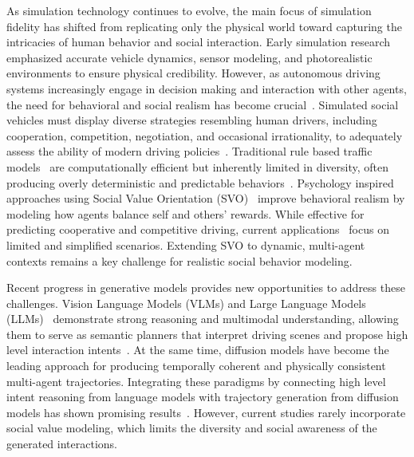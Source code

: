 As simulation technology continues to evolve, the main focus of simulation fidelity has shifted from replicating only the physical world toward capturing the intricacies of human behavior and social interaction.  Early simulation research~\citep{feng2022trafficgen, ding2024realgen} emphasized accurate vehicle dynamics, sensor modeling, and photorealistic environments to ensure physical credibility. However, as autonomous driving systems increasingly engage in decision making and interaction with other agents, the need for behavioral and social realism has become crucial~\citep{zhan2019interaction}. Simulated social vehicles must display diverse strategies resembling human drivers, including cooperation, competition, negotiation, and occasional irrationality, to adequately assess the ability of modern driving policies~\citep{schwarting2019social, jin2024surrealdriver}. Traditional rule based traffic models~\citep{treiber2000congested} are computationally efficient but inherently limited in diversity, often producing overly deterministic and predictable behaviors~\citep{suo2021trafficsim}. 
Psychology inspired approaches using Social Value Orientation (SVO)~\citep{schwarting2019social} improve behavioral realism by modeling how agents balance self and others' rewards. While effective for predicting cooperative and competitive driving, current applications~\citep{dai2023socially} focus on limited and simplified scenarios. Extending SVO to dynamic, multi-agent contexts remains a key challenge for realistic social behavior modeling.

Recent progress in generative models provides new opportunities to address these challenges. Vision Language Models (VLMs) and Large Language Models (LLMs)~\citep{openai2023gpt4, liu2023visual} demonstrate strong reasoning and multimodal understanding, allowing them to serve as semantic planners that interpret driving scenes and propose high level interaction intents~\citep{xu2024drivegpt4, fu2024drive}. At the same time, diffusion models have become the leading approach for producing temporally coherent and physically consistent multi-agent trajectories. Integrating these paradigms by connecting high level intent reasoning from language models with trajectory generation from diffusion models has shown promising results~\citep{zhang2025drivegen}. However, current studies rarely incorporate social value modeling, which limits the diversity and social awareness of the generated interactions.

